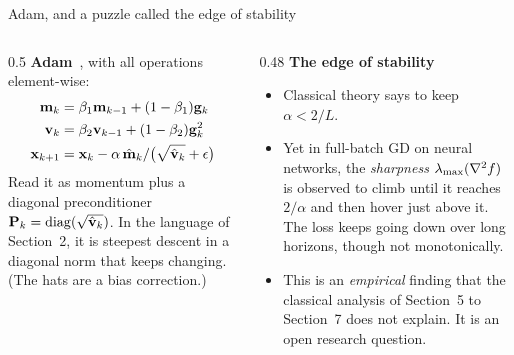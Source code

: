 \begin{frame}{Adam, and a puzzle called the edge of stability}
  \begin{columns}[T]
    \begin{column}{0.5\textwidth}
      \textbf{Adam}~\cite{kingma2015}, with all operations element-wise:
      \small
      \begin{align*}
        \mathbf m_k &= \beta_1\mathbf m_{k-1}+(1-\beta_1)\mathbf{g}_k \\
        \mathbf{v}_k &= \beta_2\mathbf{v}_{k-1}+(1-\beta_2)\mathbf{g}_k^{2}\\
        \mathbf{x}_{k+1} &= \mathbf{x}_k-\alpha\,\hat{\mathbf m}_k/\bigl(\sqrt{\hat{\mathbf{v}}_k}+\epsilon\bigr)
      \end{align*}
      \small Read it as \alert{momentum} plus a \alert{diagonal preconditioner} $\mathbf{P}_k = \operatorname{diag}(\sqrt{\hat{\mathbf{v}}_k})$. In the language
      of Section~2, it is steepest descent in a diagonal norm that keeps changing. (The hats are a bias correction.)
    \end{column}
    \begin{column}{0.48\textwidth}
      \textbf{The edge of stability}~\cite{cohen2021}
      \begin{itemize}\small
        \item Classical theory says to keep $\alpha<2/L$.
        \item Yet in full-batch GD on neural networks, the \emph{sharpness} $\lambda_{\max}(\nabla^2 f)$ is observed to climb until it
              reaches $2/\alpha$ and then hover just above it. The loss keeps going down over long horizons,
              though not monotonically.
        \item This is an \emph{empirical} finding that the classical analysis of Section~5 to Section~7 does not explain.
              It is an open research question.
      \end{itemize}
    \end{column}
  \end{columns}
\end{frame}
